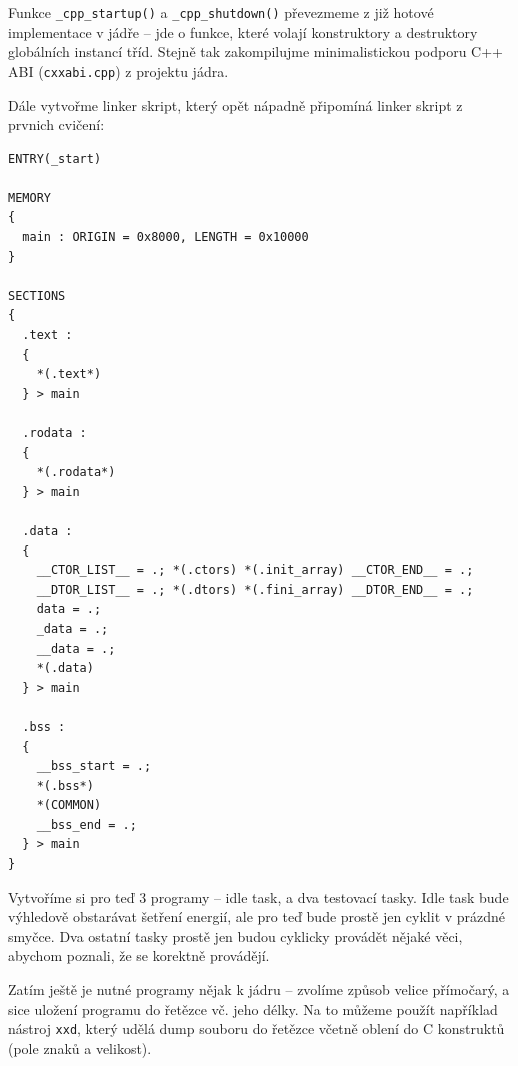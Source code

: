 \documentclass{article}
\begin{document}
Funkce {\tt \_cpp\_startup()} a {\tt \_cpp\_shutdown()} převezmeme z již hotové implementace v jádře -- jde o funkce, které volají konstruktory a destruktory globálních instancí tříd. Stejně tak zakompilujme minimalistickou podporu C++ ABI (\texttt{cxxabi.cpp}) z projektu jádra.

Dále vytvořme linker skript, který opět nápadně připomíná linker skript z prvnich cvičení:
\begin{lstlisting}
ENTRY(_start)

MEMORY
{
  main : ORIGIN = 0x8000, LENGTH = 0x10000
}

SECTIONS
{
  .text :
  {
    *(.text*)
  } > main

  .rodata :
  {
    *(.rodata*)
  } > main

  .data :
  {
    __CTOR_LIST__ = .; *(.ctors) *(.init_array) __CTOR_END__ = .; 
    __DTOR_LIST__ = .; *(.dtors) *(.fini_array) __DTOR_END__ = .;
    data = .;
    _data = .;
    __data = .;
    *(.data)
  } > main

  .bss :
  {
    __bss_start = .;
    *(.bss*)
    *(COMMON)
    __bss_end = .;
  } > main
}
\end{lstlisting}

Vytvoříme si pro teď 3 programy -- idle task, a dva testovací tasky. Idle task bude výhledově obstarávat šetření energií, ale pro teď bude prostě jen cyklit v prázdné smyčce. Dva ostatní tasky prostě jen budou cyklicky provádět nějaké věci, abychom poznali, že se korektně provádějí.

Zatím ještě je nutné programy nějak  k jádru -- zvolíme způsob velice přímočarý, a sice uložení programu do řetězce vč. jeho délky. Na to můžeme použít například nástroj \texttt{xxd}, který udělá dump souboru do řetězce včetně oblení do C konstruktů (pole znaků a velikost).
\end{document}
